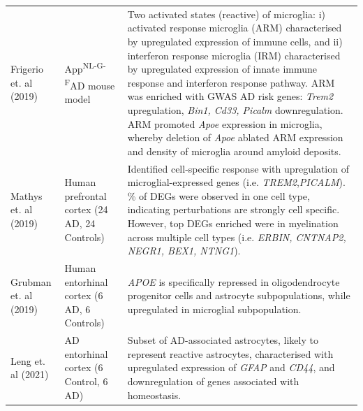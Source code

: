 \begin{landscape}
\begin{longtable}[c]{p{4cm}p{4cm}p{18cm}}
		\centering Frigerio et. al (2019)\cite{Frigerio2019} &
		\centering App\textsuperscript{NL-G-F}\newline AD mouse model  &
		\tabitem Two activated states (reactive) of microglia: i) activated response microglia (ARM) characterised by upregulated expression of immune cells, and ii) interferon response microglia (IRM) characterised by upregulated expression of innate immune response and interferon response pathway.  \newline
		\tabitem ARM was enriched with GWAS AD risk genes: \textit{Trem2} upregulation, \textit{Bin1, Cd33, Picalm} downregulation.  \newline
		\tabitem ARM promoted \textit{Apoe} expression in microglia, whereby deletion of \textit{Apoe} ablated ARM expression and density of microglia around amyloid deposits. \\
		\hdashline[0.5pt/5pt]
		
		\centering Mathys et. al (2019)\cite{Mathys2019} &
		\centering Human prefrontal cortex (24 AD, 24 Controls)  &
		\tabitem Identified cell-specific response with upregulation of microglial-expressed genes (i.e. \textit{TREM2},\textit{PICALM}). \newline
		\tabitem 95\% of DEGs were observed in one cell type, indicating perturbations are strongly cell specific.  However, top DEGs enriched were in myelination across multiple cell types (i.e. \textit{ERBIN, CNTNAP2, NEGR1, BEX1, NTNG1}).   \\
		\hdashline[0.5pt/5pt]
		
		\centering Grubman et. al (2019)\cite{Grubman2019} &
		\centering Human entorhinal cortex (6 AD, 6 Controls)  &
		\tabitem \textit{APOE} is specifically repressed in oligodendrocyte progenitor cells and astrocyte subpopulations, while upregulated in microglial subpopulation.  \\
		\hdashline[0.5pt/5pt]
		
		\centering Leng et. al (2021)\cite{Leng2021} &
		\centering AD entorhinal cortex \newline(6 Control, 6 AD)  &
		\tabitem Subset of AD-associated astrocytes, likely to represent reactive astrocytes, characterised with upregulated expression of \textit{GFAP} and \textit{CD44}, and downregulation of genes associated with homeostasis.  		
		\\* \bottomrule
	\end{longtable}
\end{landscape}
\restoregeometry


